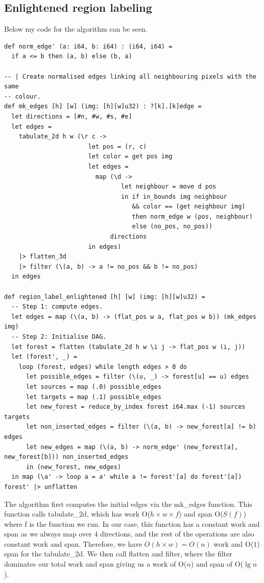 \subsection{Enlightened region labeling}
Below my code for the algorithm can be seen.
\begin{lstlisting}[language={futhark}]
def norm_edge' (a: i64, b: i64) : (i64, i64) =
  if a <= b then (a, b) else (b, a)

-- | Create normalised edges linking all neighbouring pixels with the same
-- colour.
def mk_edges [h] [w] (img: [h][w]u32) : ?[k].[k]edge =
  let directions = [#n, #w, #s, #e]
  let edges =
    tabulate_2d h w (\r c ->
                       let pos = (r, c)
                       let color = get pos img
                       let edges =
                         map (\d ->
                                let neighbour = move d pos
                                in if in_bounds img neighbour
                                   && color == (get neighbour img)
                                   then norm_edge w (pos, neighbour)
                                   else (no_pos, no_pos))
                             directions
                       in edges)
    |> flatten_3d
    |> filter (\(a, b) -> a != no_pos && b != no_pos)
  in edges

def region_label_enlightened [h] [w] (img: [h][w]u32) =
  -- Step 1: compute edges.
  let edges = map (\(a, b) -> (flat_pos w a, flat_pos w b)) (mk_edges img)
  -- Step 2: Initialise DAG.
  let forest = flatten (tabulate_2d h w \i j -> flat_pos w (i, j))
  let (forest', _) =
    loop (forest, edges) while length edges > 0 do
      let possible_edges = filter (\(u, _) -> forest[u] == u) edges
      let sources = map (.0) possible_edges
      let targets = map (.1) possible_edges
      let new_forest = reduce_by_index forest i64.max (-1) sources targets
      let non_inserted_edges = filter (\(a, b) -> new_forest[a] != b) edges
      let new_edges = map (\(a, b) -> norm_edge' (new_forest[a], new_forest[b])) non_inserted_edges
      in (new_forest, new_edges)
  in map (\a' -> loop a = a' while a != forest'[a] do forest'[a]) forest' |> unflatten
\end{lstlisting}

The algorithm first computes the initial edges via the mk\_edges function. This
function calls tabulate\_2d, which has work O($h \times w \times f$) and span
O($S(f)$) where f is the function we run. In our case, this function has a
constant work and span as we always map over 4 directions, and the rest of the
operations are also constant work and span. Therefore, we have $O(h \times w) =
O(n)$ work and O($1$) span for the tabulate\_2d. We then call flatten and
filter, where the filter dominates our total work and span giving us a work of
O($n$) and span of O($\lg n$).

